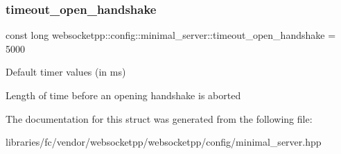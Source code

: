 \subsubsection{\texorpdfstring{timeout\+\_\+open\+\_\+handshake}{timeout\_open\_handshake}}
{\footnotesize\ttfamily const long websocketpp\+::config\+::minimal\+\_\+server\+::timeout\+\_\+open\+\_\+handshake = 5000\hspace{0.3cm}{\ttfamily [static]}}



Default timer values (in ms) 

Length of time before an opening handshake is aborted 

The documentation for this struct was generated from the following file\+:\begin{DoxyCompactItemize}
\item 
libraries/fc/vendor/websocketpp/websocketpp/config/minimal\+\_\+server.\+hpp\end{DoxyCompactItemize}
